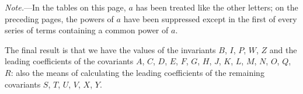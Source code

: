 \documentclass[11pt,a4paper]{article}
\begin{document}
\medskip
\noindent
\textit{Note.}---In the tables on this page, $a$ has been treated like
the other letters; on the preceding pages, the powers of $a$ have been
suppressed except in the first of every series of terms containing a
common power of $a$.

\medskip
The final result is that we have the values of the invariants $B$, $I$,
$P$, $W$, $Z$ and the leading coefficients of the covariants $A$, $C$,
$D$, $E$, $F$, $G$, $H$, $J$, $K$, $L$, $M$, $N$, $O$, $Q$, $R$: also
the means of calculating the leading coefficients of the remaining
covariants $S$, $T$, $U$, $V$, $X$, $Y$.
\end{document}
